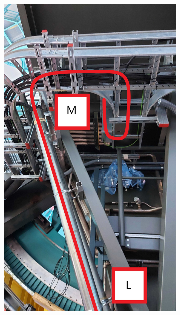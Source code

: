 \begin{figure}
\begin{subfigure}{0.40\textwidth}
    \includegraphics[width=\textwidth]{images/27-1.jpg}
  \end{subfigure}
\end{figure}

